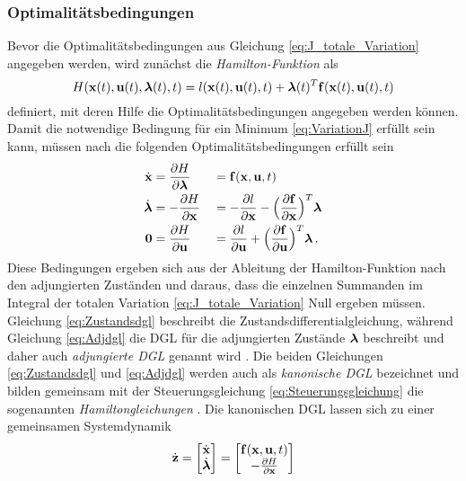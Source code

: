\subsubsection{Optimalitätsbedingungen}\label{subsubsec:Optimalitätsbedingungen}
Bevor die Optimalitätsbedingungen aus Gleichung \eqref{eq:J_totale_Variation} angegeben werden, wird zunächst die \textit{Hamilton-Funktion} als 
\begin{equation}
	H(\boldsymbol{\mathrm{x}}(t),\boldsymbol{\mathrm{u}}(t),\boldsymbol{\mathrm{\lambda}}(t),t) = l(\boldsymbol{\mathrm{x}}(t),\boldsymbol{\mathrm{u}}(t),t) + \boldsymbol{\mathrm{\lambda}}(t)^T\boldsymbol{\mathrm{f}}(\boldsymbol{\mathrm{x}}(t),\boldsymbol{\mathrm{u}}(t),t) \label{eq:Hamilton}
\end{equation}
definiert, mit deren Hilfe die Optimalitätsbedingungen angegeben werden können. Damit die notwendige Bedingung für ein Minimum \eqref{eq:VariationJ} erfüllt sein kann, müssen nach \cite{KnutGraichen.2012} die folgenden Optimalitätsbedingungen erfüllt sein 
\begin{alignat}{2}
	\dot{\boldsymbol{\mathrm{x}}} &= \frac{\partial H}{\partial\boldsymbol{\mathrm{\lambda}}} & &= \boldsymbol{\mathrm{f}}(\boldsymbol{\mathrm{x}},\boldsymbol{\mathrm{u}},t) \label{eq:Zustandsdgl} \\
	\dot{\boldsymbol{\mathrm{\lambda}}} &= -\frac{\partial H}{\partial \boldsymbol{\mathrm{x}}} & &= -\frac{\partial l}{\partial \boldsymbol{\mathrm{x}}} - \Big(\frac{\partial \boldsymbol{\mathrm{f}}}{\partial \boldsymbol{\mathrm{x}}}\Big)^T \boldsymbol{\mathrm{\lambda}} \label{eq:Adjdgl} \\
	\boldsymbol{\mathrm{0}} &= \frac{\partial H}{\partial \boldsymbol{\mathrm{u}}} & &= \frac{\partial l}{\partial \boldsymbol{\mathrm{u}}} + \Big(\frac{\partial \boldsymbol{\mathrm{f}}}{\partial \boldsymbol{\mathrm{u}}}\Big)^T \boldsymbol{\mathrm{\lambda}}\,. \label{eq:Steuerungsgleichung} 
\end{alignat}
Diese Bedingungen ergeben sich aus der Ableitung der Hamilton-Funktion nach den adjungierten Zuständen und daraus, dass die einzelnen Summanden im Integral der totalen Variation \eqref{eq:J_totale_Variation} Null ergeben müssen. Gleichung \eqref{eq:Zustandsdgl} beschreibt die Zustandsdifferentialgleichung, während Gleichung \eqref{eq:Adjdgl} die \gls{DGL} für die adjungierten Zustände $\boldsymbol{\mathrm{\lambda}}$ beschreibt und daher auch \textit{adjungierte \gls{DGL}} genannt wird \cite{Konigorski.2019}. Die beiden Gleichungen \eqref{eq:Zustandsdgl} und \eqref{eq:Adjdgl} werden auch als \textit{kanonische \gls{DGL}} bezeichnet und bilden gemeinsam mit der Steuerungsgleichung \eqref{eq:Steuerungsgleichung} die sogenannten \textit{Hamiltongleichungen} \cite{Konigorski.2019}. Die kanonischen \gls{DGL} lassen sich zu einer gemeinsamen Systemdynamik 
\begin{equation}
	\dot{\boldsymbol{\mathrm{z}}} = \begin{bmatrix}
	\dot{\boldsymbol{\mathrm{x}}} \\
	\dot{\boldsymbol{\mathrm{\lambda}}}
	\end{bmatrix} = 
	\begin{bmatrix}
	\boldsymbol{\mathrm{f}}(\boldsymbol{\mathrm{x}},\boldsymbol{\mathrm{u}},t) \\
	-\frac{\partial H}{\partial \boldsymbol{\mathrm{x}}}
	\end{bmatrix} \label{eq:Sysdyn_z}
\end{equation}
